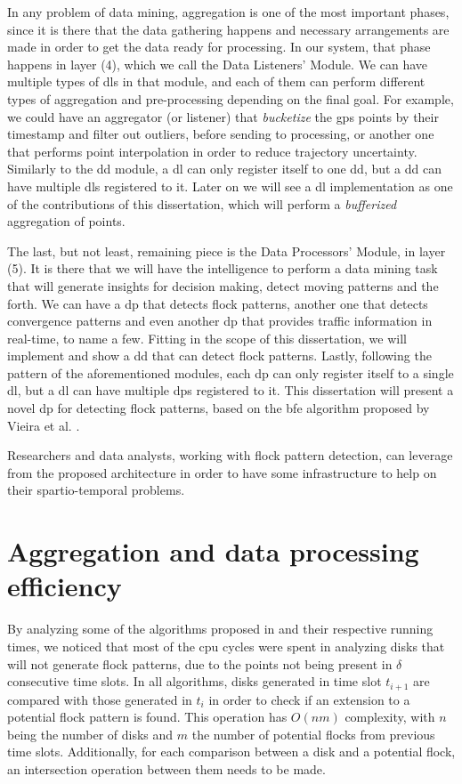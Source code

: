 In any problem of data mining, aggregation is one of the most important phases, since it is there that the data
gathering happens and necessary arrangements are made in order to get the data ready for processing. In our system, that
phase happens in layer (4), which we call the Data Listeners' Module. We can have multiple types of \acp{dl} in that
module, and each of them can perform different types of aggregation and pre-processing depending on the final goal. For
example, we could have an aggregator (or listener) that \textit{bucketize} the \ac{gps} points by their timestamp and
filter out outliers, before sending to processing, or another one that performs point interpolation in order to reduce
trajectory uncertainty. Similarly to the \ac{dd} module, a \ac{dl} can only register itself to one \ac{dd}, but a
\ac{dd} can have multiple \acp{dl} registered to it. Later on we will see a \ac{dl} implementation as one of the
contributions of this dissertation, which will perform a \textit{bufferized} aggregation of points.

The last, but not least, remaining piece is the Data Processors' Module, in layer (5). It is there that we will have the
intelligence to perform a data mining task that will generate insights for decision making, detect moving patterns and
the forth. We can have a \ac{dp} that detects flock patterns, another one that detects convergence patterns and even
another \ac{dp} that provides traffic information in real-time, to name a few. Fitting in the scope of this
dissertation, we will implement and show a \ac{dd} that can detect flock patterns. Lastly, following the pattern of the
aforementioned modules, each \ac{dp} can only register itself to a single \ac{dl}, but a \ac{dl} can have multiple
\acp{dp} registered to it. This dissertation will present a novel \ac{dp} for detecting flock patterns, based on the
\ac{bfe} algorithm proposed by Vieira et al. \citep{vieira}.

Researchers and data analysts, working with flock pattern detection, can leverage from the proposed architecture in
order to have some infrastructure to help on their spartio-temporal problems.

\section{Aggregation and data processing efficiency}
\label{sec:aggreg_efficiency}
By analyzing some of the algorithms proposed in  and their respective running times, we noticed
that most of the \ac{cpu} cycles were spent in analyzing disks that will not generate flock patterns, due to the points
not being present in $\delta$ consecutive time slots. In all algorithms, disks generated in time slot $t_{i+1}$ are
compared with those generated in $t_{i}$ in order to check if an extension to a potential flock pattern is found. This
operation has $O(nm)$ complexity, with $n$ being the number of disks and $m$ the number of potential flocks from
previous time slots.  Additionally, for each comparison between a disk and a potential flock, an intersection operation
between them needs to be made.


